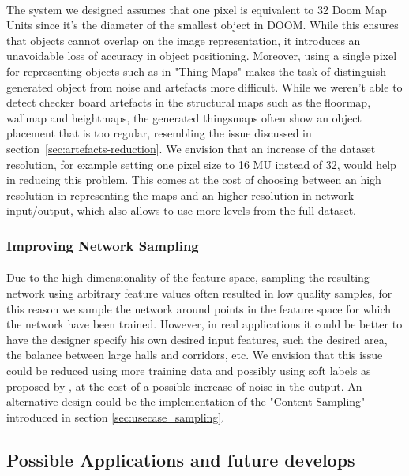 \paragraph{} The system we designed assumes that one pixel is equivalent to 32 Doom Map Units since it's the diameter of the smallest object in DOOM. While this ensures that objects cannot overlap on the image representation, it introduces an unavoidable loss of accuracy in object positioning. Moreover, using a single pixel for representing objects such as in "Thing Maps" makes the task of distinguish generated object from noise and artefacts more difficult. While we weren't able to detect checker board artefacts in the structural maps such as the floormap, wallmap and heightmaps, the generated \glspl{thingsmap} often show an object placement that is too regular, resembling the issue discussed in section~\ref{sec:artefacts-reduction}. We envision that an increase of the dataset resolution, for example setting one pixel size to 16 MU instead of 32, would help in reducing this problem. This comes at the cost of choosing between an high resolution in representing the maps and an higher resolution in network input/output, which also allows to use more levels from the full dataset.

\subsubsection{Improving Network Sampling}
\label{sec:sampling}
\paragraph{} Due to the high dimensionality of the feature space, sampling the resulting network using arbitrary feature values often resulted in low quality samples, for this reason we sample the network around points in the feature space for which the network have been trained. However, in real applications it could be better to have the designer specify his own desired input features, such the desired area, the balance between large halls and corridors, etc. We envision that this issue could be reduced using more training data and possibly using soft labels as proposed by \cite{improved_gan}, at the cost of a possible increase of noise in the output. An alternative design could be the implementation of the "Content Sampling" introduced in section \ref{sec:usecase_sampling}.

\subsection{Possible Applications and future develops}
